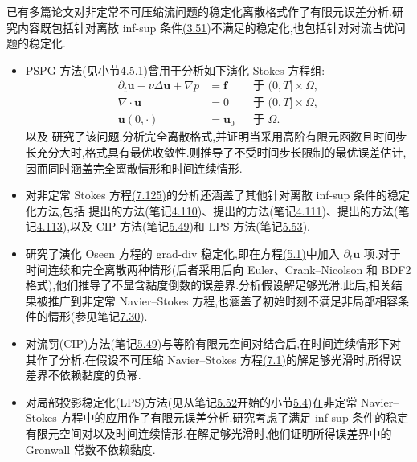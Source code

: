 \begin{note}[含稳定化的离散格式]\label{note:stabilized-discretizations}
已有多篇论文对非定常不可压缩流问题的稳定化离散格式作了有限元误差分析.研究内容既包括针对离散 inf-sup 条件\hyperref[eq:discrete-infsup-condition]{(3.51)}不满足的稳定化,也包括针对对流占优问题的稳定化.
\begin{itemize}
  \item PSPG 方法(见小节\hyperref[sec:stokes-pspg]{4.5.1})曾用于分析如下演化 Stokes 方程组:
\begin{equation}\label{eq:transient-stokes-stabilization}
\begin{aligned}
 \partial_t\bm{u}-\nu\Delta\bm{u}+\nabla p
   &=\bm{f}
     &&\text{于 }(0,T]\times\Omega,\\
 \nabla\cdot\bm{u}&=0
     &&\text{于 }(0,T]\times\Omega,\\
 \bm{u}(0,\cdot)&=\bm{u}_0
     &&\text{于 }\Omega.
\end{aligned}
\end{equation}
\textcite{BurmanFernandez2011}以及 \textcite{JohnNovo2015}研究了该问题.\textcite{BurmanFernandez2011}分析完全离散格式,并证明当采用高阶有限元函数且时间步长充分大时,格式具有最优收敛性.\textcite{JohnNovo2015}则推导了不受时间步长限制的最优误差估计,因而同时涵盖完全离散情形和时间连续情形.
  \item \textcite{BurmanFernandez2008}对非定常 Stokes 方程\hyperref[eq:transient-stokes-stabilization]{(7.125)}的分析还涵盖了其他针对离散 inf-sup 条件的稳定化方法,包括 \textcite{BrezziPitkaranta1984}提出的方法(笔记\hyperref[note:stokes-brezzi-pitkaranta-stabilization]{4.110})、\textcite{CodinaBlasco1997}提出的方法(笔记\hyperref[note:stokes-pressure-gradient-fluctuations]{4.111})、\textcite{DohrmannBochev2004}提出的方法(笔记\hyperref[note:stokes-pressure-fluctuation-stabilization]{4.113}),以及 CIP 方法(笔记\hyperref[note:oseen-cip-method]{5.49})和 LPS 方法(笔记\hyperref[note:oseen-lps-infsup]{5.53}).
  \item \textcite{deFrutos2016b}研究了演化 Oseen 方程的 grad-div 稳定化,即在方程\hyperref[eq:oseen-strong]{(5.1)}中加入 $\partial_t\bm{u}$ 项.对于时间连续和完全离散两种情形(后者采用后向 Euler、Crank--Nicolson 和 BDF2 格式),他们推导了不显含黏度倒数的误差界.分析假设解足够光滑.此后,相关结果被推广到非定常 Navier--Stokes 方程\textcite{deFrutos2016a},也涵盖了初始时刻不满足非局部相容条件的情形(参见笔记\hyperref[note:time-dependent-initial-compatibility]{7.30}).
  \item 对流罚(CIP)方法(笔记\hyperref[note:oseen-cip-method]{5.49})与等阶有限元空间对结合后,\textcite{BurmanFernandez2007}在时间连续情形下对其作了分析.在假设不可压缩 Navier--Stokes 方程\hyperref[eq:time-dependent-ns-strong]{(7.1)}的解足够光滑时,所得误差界不依赖黏度的负幂.
  \item \textcite{ArndtDallmannLube2015}对局部投影稳定化(LPS)方法(见从笔记\hyperref[note:oseen-lps-method]{5.52}开始的小节\hyperref[sec:oseen-other-stabilization-methods]{5.4})在非定常 Navier--Stokes 方程中的应用作了有限元误差分析.研究考虑了满足 inf-sup 条件的稳定有限元空间对以及时间连续情形.在解足够光滑时,他们证明所得误差界中的 Gronwall 常数不依赖黏度.
\end{itemize}
\end{note}

